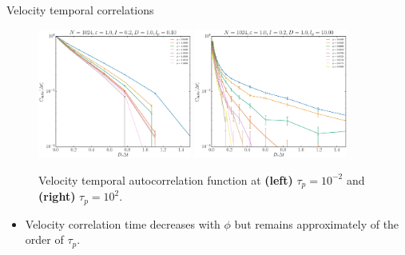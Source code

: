 \documentclass{beamer}
\begin{document}
\begin{frame}{Velocity temporal correlations}

\begin{figure}
\centering
\includegraphics[width=0.45\textwidth]{cvvtCM_No1024_Tl1000_Rn1000.eps}
\includegraphics[width=0.45\textwidth]{cvvtCM_No1024_Tl1000_Rj1000.eps}
\caption{Velocity temporal autocorrelation function at {\bf (left)} $\tau_p = 10^{-2}$ and {\bf (right)} $\tau_p = 10^2$.}
\end{figure}

\begin{itemize}
  \item Velocity correlation time decreases with $\phi$ but remains approximately of the order of $\tau_p$.
\end{itemize}

\end{frame}
\end{document}
